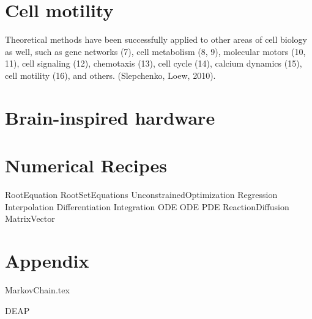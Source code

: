 \documentclass[11pt]{book}
\begin{document}

 




 

\part{Cell motility}

Theoretical methods have been successfully applied to other areas of cell biology as well,
such as gene networks (7), cell metabolism (8, 9), molecular motors (10, 11), cell signaling
(12), chemotaxis (13), cell cycle (14), calcium dynamics (15), cell motility (16), and others.
(Slepchenko, Loew, 2010).

\part{Brain-inspired hardware}




\part{Numerical Recipes}
{RootEquation}
{RootSetEquations}
{UnconstrainedOptimization}
{Regression}
{Interpolation}
{Differentiation}
{Integration}
{ODE}
{ODE}
{PDE}
{ReactionDiffusion}
{MatrixVector}

\appendix
\part{Appendix}





%


{MarkovChain.tex}





{DEAP}
\end{document}
